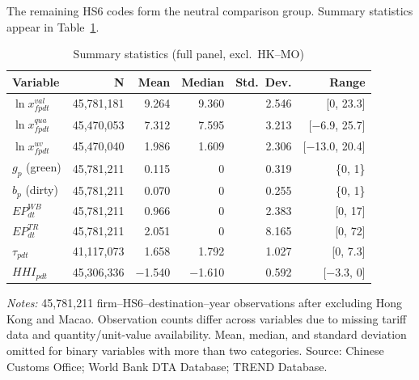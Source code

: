 \documentclass[12pt]{article}
\begin{document}
The remaining HS6 codes form the neutral comparison group. Summary statistics appear in Table~\ref{tab:sumstats}.

\begin{table}[htbp]
\centering
\caption{Summary statistics (full panel, excl.\ HK--MO)}
\label{tab:sumstats}
\small
\begin{threeparttable}
\begin{tabular}{lrrrrr}
\toprule
Variable & N & Mean & Median & Std.\ Dev. & Range \\
\midrule
$\ln x^{val}_{fpdt}$ & 45{,}781{,}181 & 9.264 & 9.360 & 2.546 & [0, 23.3] \\
$\ln x^{qua}_{fpdt}$ & 45{,}470{,}053 & 7.312 & 7.595 & 3.213 & [$-$6.9, 25.7] \\
$\ln x^{uv}_{fpdt}$  & 45{,}470{,}040 & 1.986 & 1.609 & 2.306 & [$-$13.0, 20.4] \\
$g_p$ (green)         & 45{,}781{,}211 & 0.115 & 0 & 0.319 & \{0, 1\} \\
$b_p$ (dirty)         & 45{,}781{,}211 & 0.070 & 0 & 0.255 & \{0, 1\} \\
$EP^{WB}_{dt}$        & 45{,}781{,}211 & 0.966 & 0 & 2.383 & [0, 17] \\
$EP^{TR}_{dt}$        & 45{,}781{,}211 & 2.051 & 0 & 8.165 & [0, 72] \\
$\tau_{pdt}$          & 41{,}117{,}073 & 1.658 & 1.792 & 1.027 & [0, 7.3] \\
$HHI_{pdt}$           & 45{,}306{,}336 & $-$1.540 & $-$1.610 & 0.592 & [$-$3.3, 0] \\
\bottomrule
\end{tabular}
\begin{tablenotes}\footnotesize
\item \emph{Notes:} 45{,}781{,}211 firm--HS6--destination--year observations after excluding Hong Kong
and Macao. Observation counts differ across variables due to missing tariff data and
quantity/unit-value availability. Mean, median, and standard deviation omitted for
binary variables with more than two categories. Source: Chinese Customs Office; World Bank DTA Database; TREND Database.
\end{tablenotes}
\end{threeparttable}
\end{table}
\end{document}
